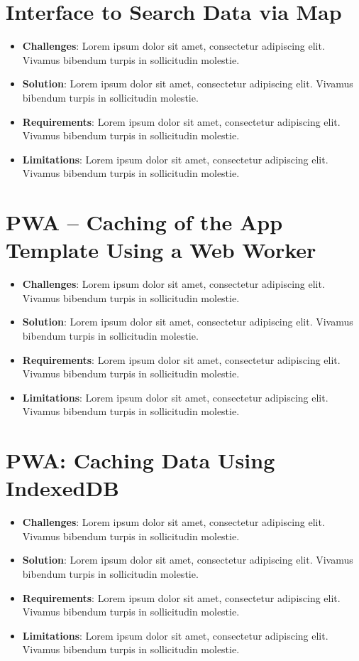 \documentclass[11pt, a4paper]{article}
\begin{document}
\section{Interface to Search Data via Map}
\begin{itemize}
  \item \textbf{Challenges}: Lorem ipsum dolor sit amet, consectetur adipiscing elit. Vivamus
  bibendum turpis in sollicitudin molestie.
  \item \textbf{Solution}: Lorem ipsum dolor sit amet, consectetur adipiscing elit. Vivamus bibendum
  turpis in sollicitudin molestie.
  \item \textbf{Requirements}: Lorem ipsum dolor sit amet, consectetur adipiscing elit. Vivamus
  bibendum turpis in sollicitudin molestie.
  \item \textbf{Limitations}: Lorem ipsum dolor sit amet, consectetur adipiscing elit. Vivamus
  bibendum turpis in sollicitudin molestie.
\end{itemize}

\section{PWA – Caching of the App Template Using a Web Worker}
\begin{itemize}
  \item \textbf{Challenges}: Lorem ipsum dolor sit amet, consectetur adipiscing elit. Vivamus
  bibendum turpis in sollicitudin molestie.
  \item \textbf{Solution}: Lorem ipsum dolor sit amet, consectetur adipiscing elit. Vivamus bibendum
  turpis in sollicitudin molestie.
  \item \textbf{Requirements}: Lorem ipsum dolor sit amet, consectetur adipiscing elit. Vivamus
  bibendum turpis in sollicitudin molestie.
  \item \textbf{Limitations}: Lorem ipsum dolor sit amet, consectetur adipiscing elit. Vivamus
  bibendum turpis in sollicitudin molestie.
\end{itemize}

\section{PWA: Caching Data Using IndexedDB}
\begin{itemize}
  \item \textbf{Challenges}: Lorem ipsum dolor sit amet, consectetur adipiscing elit. Vivamus
  bibendum turpis in sollicitudin molestie.
  \item \textbf{Solution}: Lorem ipsum dolor sit amet, consectetur adipiscing elit. Vivamus bibendum
  turpis in sollicitudin molestie.
  \item \textbf{Requirements}: Lorem ipsum dolor sit amet, consectetur adipiscing elit. Vivamus
  bibendum turpis in sollicitudin molestie.
  \item \textbf{Limitations}: Lorem ipsum dolor sit amet, consectetur adipiscing elit. Vivamus
  bibendum turpis in sollicitudin molestie.
\end{itemize}
\end{document}
